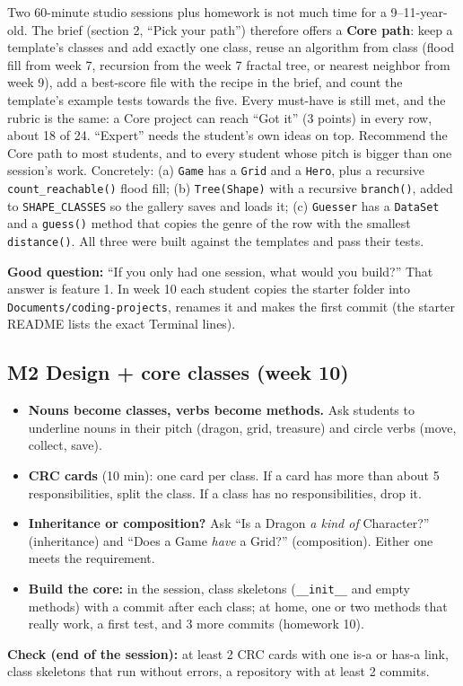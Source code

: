 \documentclass[level=3,teacher]{kidscode}
\begin{document}
\begin{teachernote}
Two 60-minute studio sessions plus homework is not much time for a 9--11-year-old. The brief
(section 2, \enquote{Pick your path}) therefore offers a \textbf{Core path}: keep a template's
classes and add exactly one class, reuse an algorithm from class (flood fill from week 7,
recursion from the week 7 fractal tree, or nearest neighbor from week 9), add a best-score file
with the recipe in the brief, and count the template's example tests towards the five. Every
must-have is still met, and the rubric is the same: a Core project can reach \enquote{Got it}
(3 points) in every row, about 18 of 24. \enquote{Expert} needs the student's own ideas on top.
Recommend the Core path to most students, and to every student whose pitch is bigger than one
session's work. Concretely: (a) \texttt{Game} has a \texttt{Grid} and a \texttt{Hero}, plus a
recursive \texttt{count\_reachable()} flood fill; (b) \texttt{Tree(Shape)} with a recursive
\texttt{branch()}, added to \texttt{SHAPE\_CLASSES} so the gallery saves and loads it;
(c) \texttt{Guesser} has a \texttt{DataSet} and a \texttt{guess()} method that copies the genre of
the row with the smallest \texttt{distance()}. All three were built against the templates and pass
their tests.
\end{teachernote}
\textbf{Good question:} \enquote{If you only had one session, what would you build?} That answer
is feature 1. In week 10 each student copies the starter folder into
\texttt{Documents/coding-projects}, renames it and makes the first commit (the starter README
lists the exact Terminal lines).

\subsection{M2 Design + core classes (week 10)}
\begin{itemize}[itemsep=2pt]
  \item \textbf{Nouns become classes, verbs become methods.} Ask students to underline nouns in
        their pitch (dragon, grid, treasure) and circle verbs (move, collect, save).
  \item \textbf{CRC cards} (10 min): one card per class. If a card has more than about 5
        responsibilities, split the class. If a class has no responsibilities, drop it.
  \item \textbf{Inheritance or composition?} Ask \enquote{Is a Dragon \emph{a kind of}
        Character?} (inheritance) and \enquote{Does a Game \emph{have} a Grid?} (composition).
        Either one meets the requirement.
  \item \textbf{Build the core:} in the session, class skeletons (\texttt{\_\_init\_\_} and
        empty methods) with a commit after each class; at home, one or two methods that really
        work, a first test, and 3 more commits (homework 10).
\end{itemize}
\textbf{Check (end of the session):} at least 2 CRC cards with one is-a or has-a link, class
skeletons that run without errors, a repository with at least 2 commits.
\end{document}
